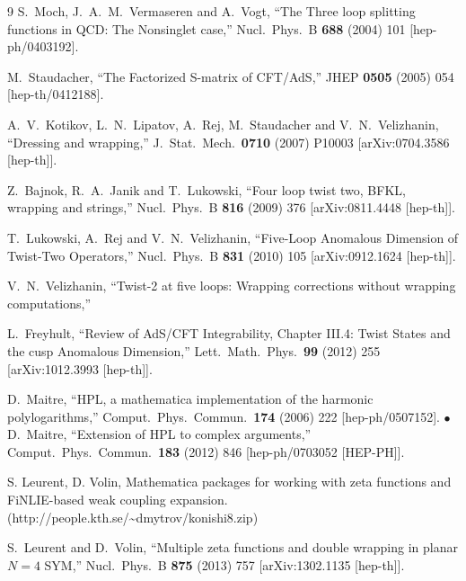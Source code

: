 \documentclass[a4paper,11pt]{article}
\numberwithin{equation}{section}
\begin{document}
\begin{thebibliography} {9}
  S.~Moch, J.~A.~M.~Vermaseren and A.~Vogt,
  ``The Three loop splitting functions in QCD: The Nonsinglet case,''
  Nucl.\ Phys.\ B {\bf 688} (2004) 101
  [hep-ph/0403192].

  M.~Staudacher,
  ``The Factorized S-matrix of CFT/AdS,''
  JHEP {\bf 0505} (2005) 054
  [hep-th/0412188].

  A.~V.~Kotikov, L.~N.~Lipatov, A.~Rej, M.~Staudacher and V.~N.~Velizhanin,
  ``Dressing and wrapping,''
  J.\ Stat.\ Mech.\  {\bf 0710} (2007) P10003
  [arXiv:0704.3586 [hep-th]].

  Z.~Bajnok, R.~A.~Janik and T.~Lukowski,
  ``Four loop twist two, BFKL, wrapping and strings,''
  Nucl.\ Phys.\ B {\bf 816} (2009) 376
  [arXiv:0811.4448 [hep-th]].

  T.~Lukowski, A.~Rej and V.~N.~Velizhanin,
  ``Five-Loop Anomalous Dimension of Twist-Two Operators,''
  Nucl.\ Phys.\ B {\bf 831} (2010) 105
  [arXiv:0912.1624 [hep-th]].

  V.~N.~Velizhanin,
  ``Twist-2 at five loops: Wrapping corrections without wrapping computations,''

  L.~Freyhult,
  ``Review of AdS/CFT Integrability, Chapter III.4: Twist States and the cusp Anomalous Dimension,''
  Lett.\ Math.\ Phys.\  {\bf 99} (2012) 255
  [arXiv:1012.3993 [hep-th]].

D.~Maitre,
  ``HPL, a mathematica implementation of the harmonic polylogarithms,''
  Comput.\ Phys.\ Commun.\  {\bf 174} (2006) 222
  [hep-ph/0507152]. $\bullet$
  D.~Maitre,
  ``Extension of HPL to complex arguments,''
  Comput.\ Phys.\ Commun.\  {\bf 183} (2012) 846
  [hep-ph/0703052 [HEP-PH]].

S. Leurent, D. Volin, Mathematica packages for working with zeta
functions and FiNLIE-based weak coupling expansion.
(http://people.kth.se/\textasciitilde{}dmytrov/konishi8.zip)

  S.~Leurent and D.~Volin,
  ``Multiple zeta functions and double wrapping in planar $N=4$ SYM,''
  Nucl.\ Phys.\ B {\bf 875} (2013) 757
  [arXiv:1302.1135 [hep-th]].


\end{thebibliography}
\end{document}

